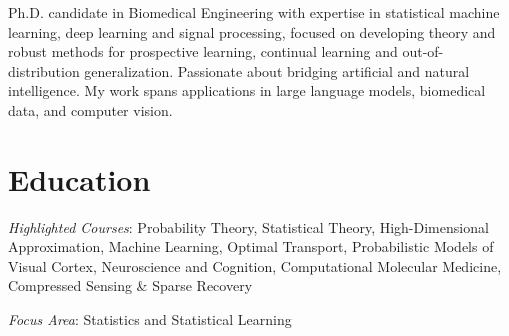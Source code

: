 \documentclass[10pt,a4paper,sans]{moderncv} %
\begin{document}
\makecvtitle %

Ph.D. candidate in Biomedical Engineering with expertise in statistical machine learning, deep learning and signal processing, focused on developing theory and robust methods for prospective learning, continual learning and out-of-distribution generalization. Passionate about bridging artificial and natural intelligence. My work spans applications in large language models, biomedical data, and computer vision.


\section{Education}
{\textit{Highlighted Courses}: Probability Theory, Statistical Theory, High-Dimensional Approximation, Machine Learning, Optimal Transport, Probabilistic Models of Visual Cortex, Neuroscience and Cognition, Computational Molecular Medicine, Compressed Sensing \& Sparse Recovery}

{\textit{Focus Area}: Statistics and Statistical Learning}

\end{document}
